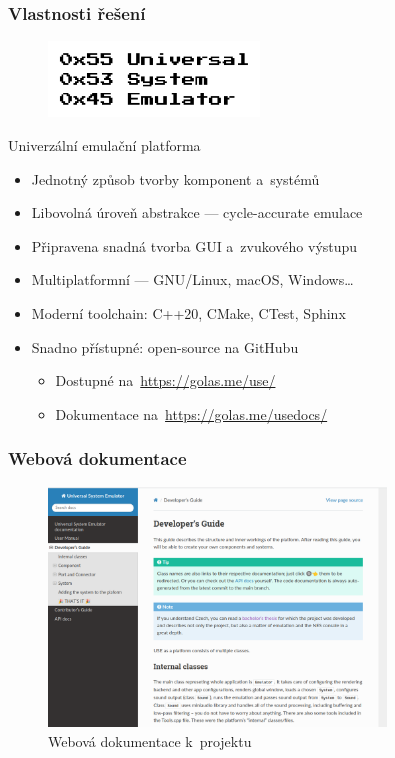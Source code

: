 \documentclass{beamer}
\begin{document}
\begin{frame}
	\frametitle{Vlastnosti řešení}
	\begin{figure}
		\centering
		\includegraphics[width=0.5\textwidth]{images/logo-full-path.pdf}
	\end{figure}
	Univerzální emulační platforma
	\begin{itemize}
		\item Jednotný způsob tvorby komponent a~systémů
		\item Libovolná úroveň abstrakce --- cycle-accurate emulace
		\item Připravena snadná tvorba GUI a~zvukového výstupu
		\item Multiplatformní --- GNU/Linux, macOS, Windows\dots
		\item Moderní toolchain: C++20, CMake, CTest, Sphinx
		\item Snadno přístupné: open-source na GitHubu
		\begin{itemize}
			\item Dostupné na~\url{https://golas.me/use/}
			\item Dokumentace na~\url{https://golas.me/usedocs/}
		\end{itemize}
	\end{itemize}
\end{frame}

\begin{frame}
	\frametitle{Webová dokumentace}
	\begin{figure}
		\centering
		\includegraphics[width=0.8\textwidth]{images/docs.png}
		\caption{\normalsize Webová dokumentace k~projektu}
	\end{figure}
\end{frame}
\end{document}
